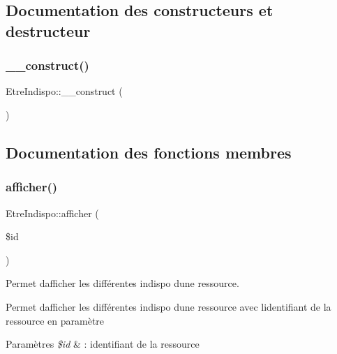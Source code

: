 \subsection{Documentation des constructeurs et destructeur}
\mbox{\label{class_etre_indispo_ab473b67e6c40586cbe176ee494255e95}} 
\subsubsection{\texorpdfstring{\+\_\+\+\_\+construct()}{\_\_construct()}}
{\footnotesize\ttfamily Etre\+Indispo\+::\+\_\+\+\_\+construct (\begin{DoxyParamCaption}{ }\end{DoxyParamCaption})}



\subsection{Documentation des fonctions membres}
\mbox{\label{class_etre_indispo_a48a60560b43b98fcd18b50d7dd81f494}} 
\subsubsection{\texorpdfstring{afficher()}{afficher()}}
{\footnotesize\ttfamily Etre\+Indispo\+::afficher (\begin{DoxyParamCaption}\item[{}]{\$id }\end{DoxyParamCaption})}



Permet d\textquotesingle{}afficher les différentes indispo d\textquotesingle{}une ressource. 

Permet d\textquotesingle{}afficher les différentes indispo d\textquotesingle{}une ressource avec l\textquotesingle{}identifiant de la ressource en paramètre 
\begin{DoxyParams}{Paramètres}
{\em \$id} & \+: identifiant de la ressource \\
\hline
\end{DoxyParams}
\mbox{\label{class_etre_indispo_a8b23db72e0f57f12cd6f863ea80963a6}} 
